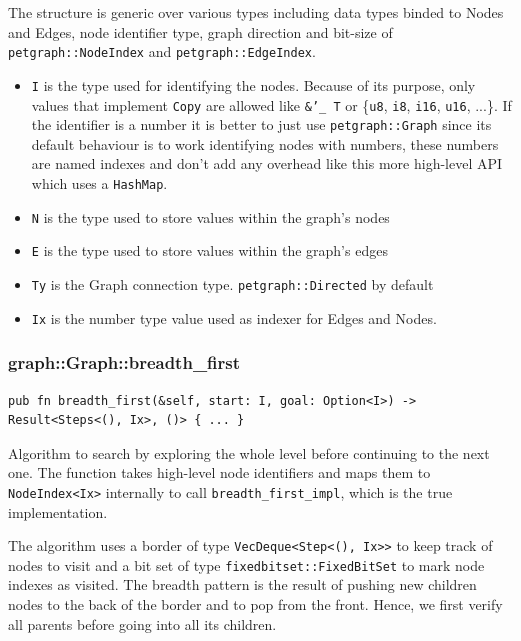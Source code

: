 The structure is generic over various types including data types binded to Nodes and Edges, node identifier type, graph direction and bit-size of
\texttt{petgraph::NodeIndex} and \texttt{petgraph::EdgeIndex}.

\begin{itemize}
 \item \texttt{I} is the type used for identifying the nodes. Because of its purpose, only values that implement
 \texttt{Copy} are allowed like \texttt{\&'\_ T} or \{\texttt{u8}, \texttt{i8}, \texttt{i16}, \texttt{u16}, ...\}. 
 If the identifier is a number it is better to just use \texttt{petgraph::Graph} since its default
 behaviour is to work identifying nodes with numbers, these numbers are named indexes and don't add any overhead
 like this more high-level API which uses a \texttt{HashMap}.
 \item \texttt{N} is the type used to store values within the graph's nodes
 \item \texttt{E} is the type used to store values within the graph's edges
 \item \texttt{Ty} is the Graph connection type. \texttt{petgraph::Directed} by default
 \item \texttt{Ix} is the number type value used as indexer for Edges and Nodes.
\end{itemize}

\subsubsection{graph::Graph::breadth\_first}
\begin{verbatim}
pub fn breadth_first(&self, start: I, goal: Option<I>) -> Result<Steps<(), Ix>, ()> { ... }
\end{verbatim}

Algorithm to search by exploring the whole level before continuing to the next one.
The function takes high-level node identifiers and maps them to \texttt{NodeIndex<Ix>} internally to
call \texttt{breadth\_first\_impl}, which is the true implementation.

The algorithm uses a border of type \texttt{VecDeque<Step<(), Ix>>} to keep track of nodes to visit and
a bit set of type \texttt{fixedbitset::FixedBitSet} to mark node indexes as visited.
The breadth pattern is the result of pushing new children nodes to the back of the border
and to pop from the front. Hence, we first verify all parents before going into all its children.

